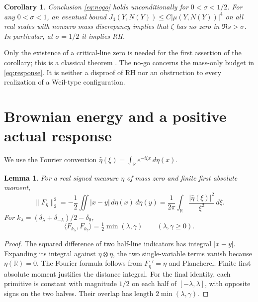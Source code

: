 \documentclass[11pt,a4paper]{article}
\newtheorem{lemma}[theorem]{Lemma}
\newtheorem{corollary}[theorem]{Corollary}
\theoremstyle{definition}
\theoremstyle{remark}
\newcommand{\RR}{\mathbb R}
\newcommand{\dd}{\,d}
\begin{document}
\begin{corollary}\label{cor:rh}
Conclusion \eqref{eq:nogo} holds unconditionally for \(0<\sigma<1/2\).
For any \(0<\sigma<1\), an eventual bound
\(J_4(Y,N(Y))\le C|\mu(Y,N(Y))|^4\) on all real scales with nonzero
mass discrepancy implies that \(\zeta\) has no zero in \(\Re s>\sigma\).
In particular, at \(\sigma=1/2\) it implies RH.
\end{corollary}

Only the existence of a critical-line zero is needed for the first
assertion of the corollary; this is a classical theorem
\cite{Hardy,DLMF}. The no-go concerns the mass-only budget in
\eqref{eq:response}. It is neither a disproof of RH nor an obstruction
to every realization of a Weil-type configuration.

\section{Brownian energy and a positive actual response}

We use the Fourier convention
\(\widehat\eta(\xi)=\int_{\RR}e^{-i\xi x}\dd\eta(x)\).

\begin{lemma}\label{lem:energy}
For a real signed measure \(\eta\) of mass zero and finite first
absolute moment,
\begin{equation}
 \|F_\eta\|_2^2
 =-\frac12\iint |x-y|\dd\eta(x)\dd\eta(y)
 =\frac1{2\pi}\int_\RR\frac{|\widehat\eta(\xi)|^2}{\xi^2}\dd\xi.
 \label{eq:energy}
\end{equation}
For \(k_\lambda=(\delta_\lambda+\delta_{-\lambda})/2-\delta_0\),
\[
 \langle F_{k_\lambda},F_{k_\gamma}\rangle
 =\tfrac12\min(\lambda,\gamma)\qquad(\lambda,\gamma\ge0).
\]
\end{lemma}
\begin{proof}
The squared difference of two half-line indicators has integral
\(|x-y|\). Expanding its integral against \(\eta\otimes\eta\), the two
single-variable terms vanish because \(\eta(\RR)=0\).
The Fourier formula follows from \(F_\eta'=\eta\) and Plancherel.
Finite first absolute moment justifies the distance integral.
For the final identity, each primitive is constant with magnitude
\(1/2\) on each half of \([-\lambda,\lambda]\), with opposite signs
on the two halves. Their overlap has length \(2\min(\lambda,\gamma)\).
\end{proof}
\end{document}
